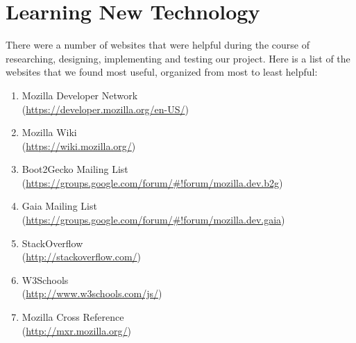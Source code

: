 \documentclass[12pt]{article}
\begin{document}
\section{Learning New Technology}
There were a number of websites that were helpful during the course of researching, designing, implementing and testing our project. Here is a list of the websites that we found most useful, organized from most to least helpful:
\begin{enumerate}
	\item Mozilla Developer Network\\ (\href{https://developer.mozilla.org/en-US/}{https://developer.mozilla.org/en-US/})
	\item Mozilla Wiki\\ (\href{https://wiki.mozilla.org/}{https://wiki.mozilla.org/})
	\item Boot2Gecko Mailing List\\ (\href{https://groups.google.com/forum/\#!forum/mozilla.dev.b2g}{https://groups.google.com/forum/\#!forum/mozilla.dev.b2g})
	\item Gaia Mailing List\\ (\href{https://groups.google.com/forum/\#!forum/mozilla.dev.gaia}{https://groups.google.com/forum/\#!forum/mozilla.dev.gaia})
	\item StackOverflow\\ (\href{http://stackoverflow.com/}{http://stackoverflow.com/})
	\item W3Schools\\ (\href{http://www.w3schools.com/js/}{http://www.w3schools.com/js/}) 
	\item Mozilla Cross Reference\\ (\href{http://mxr.mozilla.org/}{http://mxr.mozilla.org/})
\end{enumerate}
	
\end{document}
